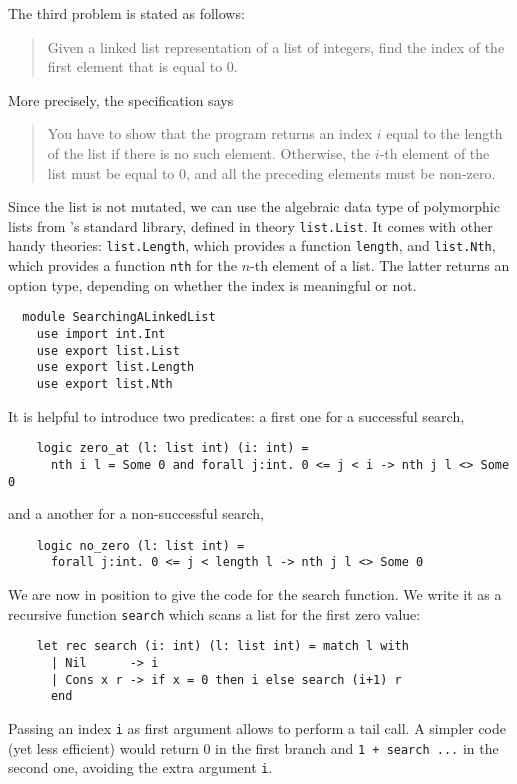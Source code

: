 The third problem is stated as follows:
\begin{quote}
  Given a linked list representation of a list of integers,
  find the index of the first element that is equal to 0.
\end{quote}
More precisely, the specification says
\begin{quote}
  You have to show that the program returns an index $i$ equal to the
  length of the list if there is no such element. Otherwise, the $i$-th
  element of the list must be equal to 0, and all the preceding
  elements must be non-zero.
\end{quote}
Since the list is not mutated, we can use the algebraic data type of
polymorphic lists from \why's standard library, defined in theory
\texttt{list.List}. It comes with other handy theories:
\texttt{list.Length}, which provides a function \texttt{length}, and
\texttt{list.Nth}, which provides a function \texttt{nth}
for the $n$-th element of a list. The latter returns an option type,
depending on whether the index is meaningful or not.
\begin{verbatim}
  module SearchingALinkedList
    use import int.Int
    use export list.List
    use export list.Length
    use export list.Nth
\end{verbatim}
It is helpful to introduce two predicates: a first one
for a successful search,
\begin{verbatim}
    logic zero_at (l: list int) (i: int) =
      nth i l = Some 0 and forall j:int. 0 <= j < i -> nth j l <> Some 0
\end{verbatim}
and a another for a non-successful search,
\begin{verbatim}
    logic no_zero (l: list int) =
      forall j:int. 0 <= j < length l -> nth j l <> Some 0
\end{verbatim}
We are now in position to give the code for the search function.
We write it as a recursive function \texttt{search} which scans a list
for the first zero value:
\begin{verbatim}
    let rec search (i: int) (l: list int) = match l with
      | Nil      -> i
      | Cons x r -> if x = 0 then i else search (i+1) r
      end
\end{verbatim}
Passing an index \texttt{i} as first argument allows to perform a tail
call. A simpler code (yet less efficient) would return 0 in the first
branch and \texttt{1 + search ...} in the second one, avoiding the
extra argument \texttt{i}.

